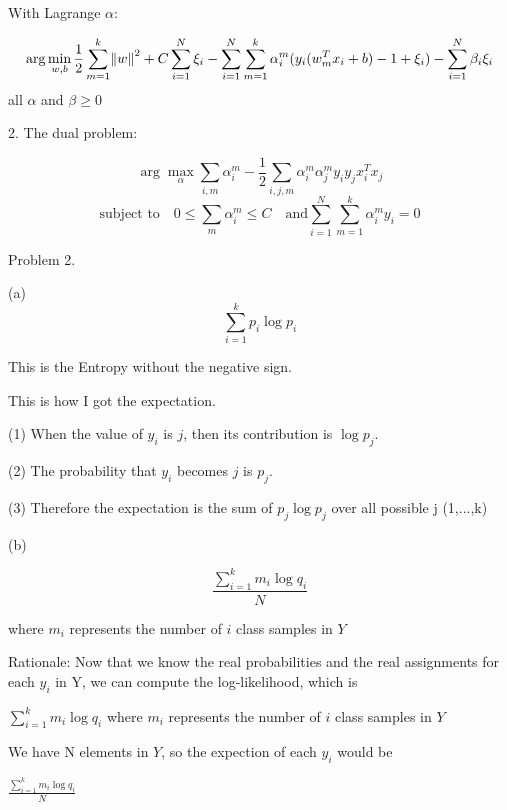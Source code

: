 \documentclass[11pt]{article}
\theoremstyle{definition}
\begin{document}
With Lagrange $\alpha$:

\begin{equation*}
\arg \min_{w,b} \frac{1}{2} \sum_{m=1}^{k} \norm{w}^2 + C \sum_{i=1}^{N}\xi_i
- \sum_{i=1}^{N}\sum_{m=1}^{k}\alpha_{i}^{m}(y_i(w_m^T x_i + b) -1 + \xi_i)
- \sum_{i=1}^{N}\beta_i\xi_i
\end{equation*}
all $\alpha$ and $\beta \ge 0$

\bigskip


2. The dual problem:

\begin{equation*}
\arg \max_\alpha \sum_{i,m} \alpha_{i}^{m} - \frac{1}{2} \sum_{i,j,m} \alpha_{i}^{m} \alpha_{j}^{m} y_i y_j x_i^T x_j
\end{equation*}
\begin{equation*}
\text{subject to} \quad 0 \le \sum_{m}\alpha_{i}^{m} \le C \quad \text{and} \sum_{i=1}^{N}\sum_{m=1}^{k} \alpha_{i}^{m} y_i =0 
\end{equation*}

\pagebreak

Problem 2.

\bigskip

(a)
\begin{equation*}
\sum_{i=1}^{k}p_i \log p_i
\end{equation*}


This is the Entropy without the negative sign.

This is how I got the expectation.

(1) When the value of $y_i$ is $j$, then its contribution is $\log p_j$.

(2) The probability that $y_i$ becomes $j$ is $p_j$.

(3) Therefore the expectation is the sum of $p_j \log p_j$ over all possible j (1,...,k)

\bigskip
(b)

\begin{equation*}
 \frac{\sum_{i=1}^{k} m_i \log q_i}{N} 
\end{equation*}

 where $m_i$ represents the number of $i$ class samples in $Y$

\bigskip

Rationale: Now that we know the real probabilities and the real assignments for each $y_i$ in Y, we can compute the log-likelihood, which is

$ \sum_{i=1}^{k} m_i \log q_i $ where $m_i$ represents the number of $i$ class samples in $Y$

We have N elements in $Y$, so the expection of each $y_i$ would be 

$ \frac{\sum_{i=1}^{k} m_i \log q_i}{N} $
\end{document}

